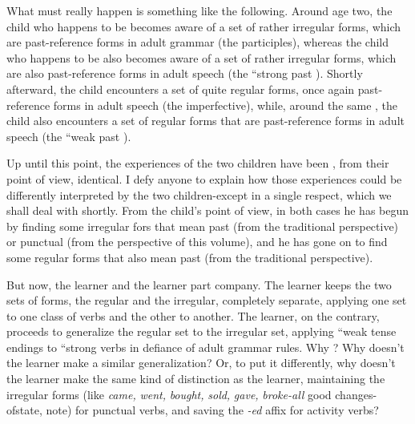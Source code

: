 What must really happen is something like the following. Around age two, the child who happens to be   becomes aware of a set of rather irregular forms, which are past-reference forms in adult grammar (the  participles), whereas the child who happens to be   also becomes aware of a set of rather irregular forms, which are also past-reference forms in adult speech (the  ``strong past ). Shortly afterward, the child   encounters a set of quite regular forms, once again past-reference forms in adult speech (the  imperfective), while, around the same , the child   also encounters a set of regular forms that are past-reference forms in adult speech (the  ``weak past ).

Up until this point, the experiences of the two children have been , from their point of view, identical. I defy anyone to explain how those experiences could be differently interpreted by the two children-except in a single respect, which we shall deal with shortly. From the child's point of view, in both cases he has begun by finding some irregular fors that mean past (from the traditional perspective) or punctual (from the perspective of this volume), and he has gone on to find some regular forms that also mean past (from the traditional perspective).

But now, the  learner and the  learner part com\-pany. The  learner keeps the two sets of forms, the regular and the irregular, completely separate, applying one set to one class of verbs and the other to another. The  learner, on the contrary, proceeds to generalize the regular set to the irregular set, applying ``weak tense endings to ``strong verbs in defiance of adult grammar rules. Why ? Why doesn't the  learner make a similar generaliza\-tion? Or, to put it differently, why doesn't the  learner make the same kind of distinction as the  learner, maintaining the irregular forms (like \textit{came,} \textit{went,} \textit{bought,} \textit{sold,} \textit{gave,} \textit{broke-all} good changes-ofstate, note) for punctual verbs, and saving the \textit{{}-ed} affix for activity verbs?

